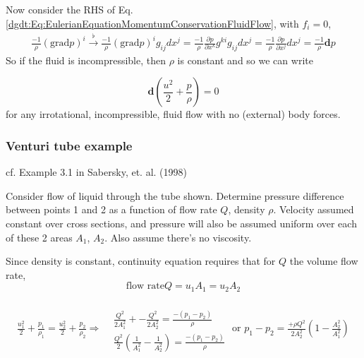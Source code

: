 Now consider the RHS of Eq. \ref{dgdt:Eq:EulerianEquationMomentumConservationFluidFlow}, with $f_i =0$,
\[
\begin{gathered}
	\frac{-1}{\rho} (\text{grad}{p})^i \xrightarrow{ \flat} \frac{-1}{\rho} (\text{grad}p)^i g_{ij} dx^j = \frac{-1}{\rho}  \frac{\partial p}{\partial x^k} g^{ki} g_{ij} dx^j = \frac{-1}{\rho} \frac{ \partial p}{\partial x^j} dx^j = \frac{-1}{\rho} \mathbf{d}p
\end{gathered}
\]
So if the fluid is incompressible, then $\rho$ is constant and so we can write

\begin{equation}
\mathbf{d} \left( \frac{u^2}{2} + \frac{p}{\rho} \right) = 0 
\end{equation}
for any irrotational, incompressible, fluid flow with no (external) body forces.

\subsubsection{Venturi tube example}

cf. Example 3.1 in Sabersky, et. al. (1998) \cite{dgdt:SAHG1998}

Consider flow of liquid through the tube shown. Determine pressure difference between points 1 and 2 as a function of flow rate $Q$, density $\rho$. Velocity assumed constant over cross sections, and pressure will also be assumed uniform over each of these 2 areas $A_1$, $A_2$. Also assume there's no viscosity. 


Since density is constant, continuity equation requires that for $Q$ the volume flow rate,
\[
\text{flow rate} Q = u_1 A_1 = u_2 A_2
\]

\[
\begin{gathered}
	\frac{u_1^2}{2} + \frac{p_1}{\rho_1} = \frac{u_2^2}{2} + \frac{p_2}{\rho_2} \Longrightarrow \begin{aligned} & \quad \\ 
	& \frac{Q^2}{2A_1^2} + - \frac{Q^2}{2A_2^2} = \frac{ -(p_1- p_2) }{\rho}  \\
	& \frac{Q^2}{2} \left( \frac{1}{A_1^2} - \frac{1}{A_2^2} \right) = \frac{-(p_1 - p_2) }{\rho} \end{aligned} \text{ or } 
p_1 - p_2 = \frac{ + \rho Q^2}{2A_2^2} \left( 1 - \frac{A_2^2}{A_1^2} \right) 
\end{gathered}
\]

